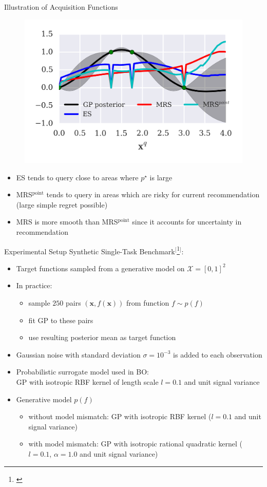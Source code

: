 \documentclass[11pt]{beamer}
\newcommand{\footcite}[1]{$^[$\footnote{\begin{tiny}\bibentry{#1}\end{tiny}}$^]$}
\begin{document}
\begin{frame}{Illustration of Acquisition Functions}
\begin{figure}
\centering
\includegraphics[width=0.48\columnwidth]{../pics/acq_comparison_2}
\end{figure}

\vspace*{-.5cm}
\begin{itemize}
\item ES tends to query close to areas where $p^\star$ is large
\item MRS$^\text{point}$ tends to query in areas which are risky for current recommendation (large simple regret possible)
\item MRS is more smooth than MRS$^\text{point}$ since it accounts for uncertainty in recommendation
\end{itemize}

\end{frame}


\begin{frame}{Experimental Setup}
Synthetic Single-Task Benchmark\footcite{hennig_entropy_2012}:
\begin{itemize}
 \item Target functions sampled from a generative model on $\mathcal{X} = [0, 1]^2$ 
 \item In practice: 
   \begin{itemize} 
   \item sample $250$ pairs $(\mathbf{x}, f(\mathbf{x}))$ from function $f \sim p(f)$
   \item fit GP to these pairs
   \item use resulting posterior mean as target function
   \end{itemize}
 \pause
 \item Gaussian noise with standard deviation $\sigma =10^{-3}$ is added to each observation
 \item Probabilistic surrogate model used in BO:\\ GP with isotropic RBF kernel of length scale $l = 0.1$ and unit signal variance
 \pause
 \item Generative model $p(f)$
    \begin{itemize} 
    \item without model mismatch: GP with isotropic RBF kernel ($l = 0.1$ and unit signal variance)
    \item with model mismatch:  GP with isotropic rational quadratic kernel ($l = 0.1$, $\alpha=1.0$ and unit signal variance)
    \end{itemize}
\end{itemize}
\end{frame}
\end{document}
